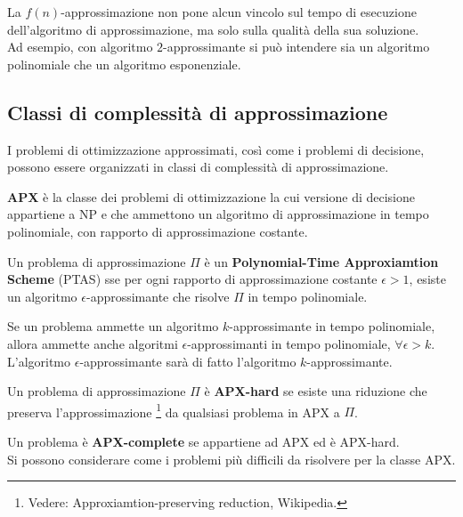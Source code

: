 \begin{rem}
    La $f(n)$-approssimazione non pone alcun vincolo sul tempo di esecuzione dell'algoritmo di approssimazione, ma solo sulla qualità della sua soluzione.\\
    Ad esempio, con algoritmo $2$-approssimante si può intendere sia un algoritmo polinomiale che un algoritmo esponenziale. 
\end{rem}

\subsection*{Classi di complessità di approssimazione}
I problemi di ottimizzazione approssimati, così come i problemi di decisione, possono essere organizzati in classi di complessità di approssimazione.

\begin{defn}
    \textbf{APX} è la classe dei problemi di ottimizzazione la cui versione di decisione appartiene a NP e che ammettono un algoritmo di approssimazione in tempo polinomiale, con rapporto di approssimazione costante.
\end{defn}

\begin{defn}
    Un problema di approssimazione $\Pi$ è un \textbf{Polynomial-Time Approxiamtion Scheme} (PTAS) sse per ogni rapporto di approssimazione costante $\epsilon > 1$, esiste un algoritmo $\epsilon$-approssimante che risolve $\Pi$ in tempo polinomiale.
\end{defn}

\begin{rem}
    Se un problema ammette un algoritmo $k$-approssimante in tempo polinomiale, allora ammette anche algoritmi $\epsilon$-approssimanti in tempo polinomiale, $\forall \epsilon > k$.
    L'algoritmo $\epsilon$-approssimante sarà di fatto l'algoritmo $k$-approssimante.
\end{rem}

\begin{defn}
    Un problema di approssimazione $\Pi$ è \textbf{APX-hard} se esiste una riduzione che preserva l'approssimazione \footnote{Vedere: Approxiamtion-preserving reduction, Wikipedia.} da qualsiasi problema in APX a $\Pi$.
\end{defn}

\begin{defn}
    Un problema è \textbf{APX-complete} se appartiene ad APX ed è APX-hard.\\
    Si possono considerare come i problemi più difficili da risolvere per la classe APX.
\end{defn}

